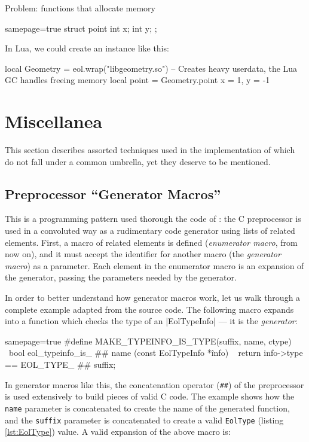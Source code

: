 Problem: functions that allocate memory

\begin{ccode*}{samepage=true}
struct point {
	int x;
	int y;
};
\end{ccode*}

In Lua, we could create an instance like this:

\begin{luacode}
local Geometry = eol.wrap("libgeometry.so")
-- Creates heavy userdata, the Lua GC handles freeing memory
local point = Geometry.point { x = 1, y = -1 }
\end{luacode}



\section{Miscellanea}

This section describes assorted techniques used in the implementation of
\Eol* which do not fall under a common umbrella, yet they deserve to be
mentioned.

\subsection{Preprocessor “Generator Macros”}
  \label{sec:cpp-abuse-genmacros}

This is a programming pattern used thorough the code of \Eol*: the
C preprocessor is used in a convoluted way as a rudimentary code generator
using lists of related elements. First, a macro of related elements is defined
(\emph{enumerator macro}, from now on), and it must accept the identifier for
another macro (the \emph{generator macro}) as a parameter. Each element in the
enumerator macro is an expansion of the generator, passing the parameters
needed by the generator.

In order to better understand how generator macros work, let us walk through
a complete example adapted from the \Eol* source code. The following macro
expands into a function which checks the type of an \Mc|EolTypeInfo| — it is
the \emph{generator}:

\begin{ccode*}{samepage=true}
#define MAKE_TYPEINFO_IS_TYPE(suffix, name, ctype)            \
    bool eol_typeinfo_is_ ## name (const EolTypeInfo *înfo) \
    { return info->type == EOL_TYPE_ ## suffix; }
\end{ccode*}

\noindent In generator macros like this, the concatenation operator
(\verb|##|) of the preprocessor is used extensively to build pieces of valid
C code. The example shows how the \verb|name| parameter is concatenated to
create the name of the generated function, and the \verb|suffix| parameter is
concatenated to create a valid \verb|EolType| (listing \vref{lst:EolType})
value. A valid expansion of the above macro is:

